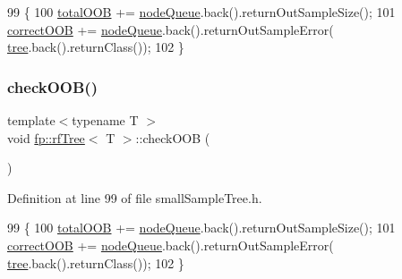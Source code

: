 \begin{DoxyCode}
99                                       \{
100                     \hyperlink{classfp_1_1rfTree_aa200dc228adc20c12e514364d2b674df}{totalOOB} += \hyperlink{classfp_1_1rfTree_af72d0a2f930fd480dfb4858885c2df23}{nodeQueue}.back().returnOutSampleSize();
101                     \hyperlink{classfp_1_1rfTree_a83832650bcea8d63cdcd480d9ddc6e6e}{correctOOB} += \hyperlink{classfp_1_1rfTree_af72d0a2f930fd480dfb4858885c2df23}{nodeQueue}.back().returnOutSampleError(
      \hyperlink{classtree}{tree}.back().returnClass());
102                 \}
\end{DoxyCode}
\mbox{\label{classfp_1_1rfTree_a45e47b318c90a1359840ab6161f20ab1}} 
\subsubsection{\texorpdfstring{check\+O\+O\+B()}{checkOOB()}\hspace{0.1cm}{\footnotesize\ttfamily [2/2]}}
{\footnotesize\ttfamily template$<$typename T $>$ \\
void \hyperlink{classfp_1_1rfTree}{fp\+::rf\+Tree}$<$ T $>$\+::check\+O\+OB (\begin{DoxyParamCaption}{ }\end{DoxyParamCaption})\hspace{0.3cm}{\ttfamily [inline]}}



Definition at line 99 of file small\+Sample\+Tree.\+h.


\begin{DoxyCode}
99                                       \{
100                     \hyperlink{classfp_1_1rfTree_aa200dc228adc20c12e514364d2b674df}{totalOOB} += \hyperlink{classfp_1_1rfTree_af72d0a2f930fd480dfb4858885c2df23}{nodeQueue}.back().returnOutSampleSize();
101                     \hyperlink{classfp_1_1rfTree_a83832650bcea8d63cdcd480d9ddc6e6e}{correctOOB} += \hyperlink{classfp_1_1rfTree_af72d0a2f930fd480dfb4858885c2df23}{nodeQueue}.back().returnOutSampleError(
      \hyperlink{classtree}{tree}.back().returnClass());
102                 \}
\end{DoxyCode}
\mbox{\label{classfp_1_1rfTree_ad226037e7f93c0fa2a1a960e19a87bed}} 
